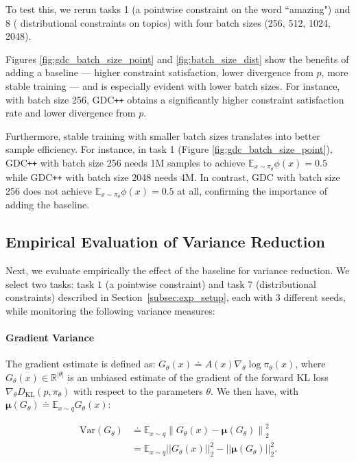To test this, we rerun tasks 1 (a pointwise constraint on the word ``amazing") and 8 ( distributional constraints on topics) with four batch sizes (256, 512, 1024, 2048). 

Figures \ref{fig:gdc_batch_size_point} and \ref{fig:batch_size_dist} show the benefits of adding a baseline --- higher constraint satisfaction, lower divergence from $p$, more stable training --- and is especially evident with lower batch sizes. For instance, with batch size 256, GDC\texttt{++}  obtains a significantly higher constraint satisfaction rate and lower divergence from $p$.

Furthermore, stable training with smaller batch sizes translates into better sample efficiency. For instance, in task 1 (Figure \ref{fig:gdc_batch_size_point}), GDC\texttt{++}  with batch size 256 needs 1M samples to achieve $\mathbb{E}_{x \sim {\pi_\theta}} \phi(x) = 0.5$ while GDC\texttt{++}  with batch size 2048 needs 4M. In contrast, GDC  with batch size 256 does not achieve $\mathbb{E}_{x \sim {\pi_\theta}} \phi(x) = 0.5$ at all, confirming the importance of adding the baseline.

\subsection{Empirical Evaluation of Variance Reduction}
\label{subsec:effectOnVarReduc}
Next, we evaluate empirically the effect of the baseline for variance reduction. We select two tasks: task $1$ (a pointwise constraint) and task $7$ (distributional constraints) described in Section~\ref{subsec:exp_setup}, each with 3 different seeds, while monitoring the following variance measures: 

\paragraph{Gradient Variance} The gradient estimate is defined as:
$G_\theta(x) \doteq A(x) \nabla_{\theta} \log {\pi_\theta}(x)$, where $G_\theta(x) \in \mathbb{R}^{|\theta|}$ is an unbiased estimate of the gradient of the forward KL loss $\nabla_\theta D_{\mathrm{KL}}(p,\pi_\theta)$ with respect to the parameters $\theta$. We then have, with $\mathbf{\mu}(G_\theta) \doteq \mathbb{E}_{x \sim q} G_\theta(x)$:

\begin{align}

\mathrm{Var}(G_\theta) &\doteq \mathbb{E}_{x \sim q} \left\|G_\theta(x)-\mathbf{\mu}(G_\theta) \right\|_{2}^{2} \\ &=\mathbb{E}_{x \sim q}||G_\theta(x)||_{2}^{2}- ||\mathbf{\mu}(G_\theta)||_{2}^{2}.

\end{align}


